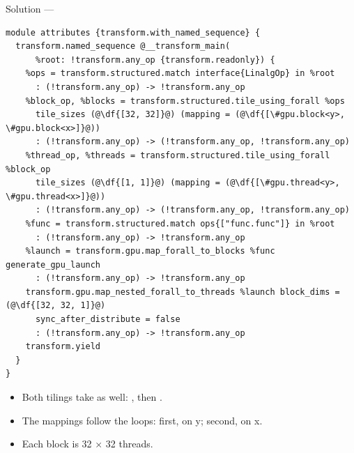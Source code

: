 \documentclass[aspectratio=169,10pt]{beamer}
\begin{document}
\begin{frame}[fragile]{Solution --- }
\begin{lstlisting}[language=mlir,basicstyle=\ttfamily\fontsize{6.4}{7.6}\selectfont]
module attributes {transform.with_named_sequence} {
  transform.named_sequence @__transform_main(
      %root: !transform.any_op {transform.readonly}) {
    %ops = transform.structured.match interface{LinalgOp} in %root
      : (!transform.any_op) -> !transform.any_op
    %block_op, %blocks = transform.structured.tile_using_forall %ops
      tile_sizes (@\df{[32, 32]}@) (mapping = (@\df{[\#gpu.block<y>, \#gpu.block<x>]}@))
      : (!transform.any_op) -> (!transform.any_op, !transform.any_op)
    %thread_op, %threads = transform.structured.tile_using_forall %block_op
      tile_sizes (@\df{[1, 1]}@) (mapping = (@\df{[\#gpu.thread<y>, \#gpu.thread<x>]}@))
      : (!transform.any_op) -> (!transform.any_op, !transform.any_op)
    %func = transform.structured.match ops{["func.func"]} in %root
      : (!transform.any_op) -> !transform.any_op
    %launch = transform.gpu.map_forall_to_blocks %func generate_gpu_launch
      : (!transform.any_op) -> !transform.any_op
    transform.gpu.map_nested_forall_to_threads %launch block_dims = (@\df{[32, 32, 1]}@)
      sync_after_distribute = false
      : (!transform.any_op) -> !transform.any_op
    transform.yield
  }
}
\end{lstlisting}
  \vspace{0.2em}
  \begin{itemize}
    \item<2-> Both tilings take  as well: \cd{[32, 32]}, then
      \cd{[1, 1]}.
    \item<3-> The mappings follow the loops:  first, on y; 
      second, on x.
    \item<4-> Each block is 32 $\times$ 32 threads.
  \end{itemize}
\end{frame}
\end{document}

